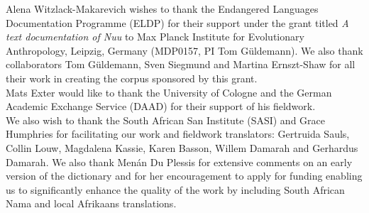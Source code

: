 Alena Witzlack-Makarevich wishes to thank the Endangered Languages
Documentation Programme (ELDP) for their support under the grant
titled \emph{A text documentation of N\textipa{\textvertline}uu} to Max
Planck Institute for Evolutionary \mbox{Anthropology}, Leipzig, Germany
(MDP0157, PI Tom G\"{u}ldemann). We also thank collaborators Tom
G\"{u}ldemann, Sven Siegmund and Martina Ernszt-Shaw for all their
work in creating the corpus sponsored by this grant.\\

Mats Exter would like to thank the University of Cologne and the
German Academic Exchange Service (DAAD) for their support of his
fieldwork.\\

We also wish to thank the South African San Institute (SASI) and Grace
Humphries for facilitating our work and fieldwork translators:
Gertruida Sauls, Collin Louw, Magdalena Kassie, Karen Basson, Willem
Damarah and Gerhardus Damarah. We also thank Men\'{a}n Du Plessis for
extensive comments on an early version of the dictionary and for her
encouragement to apply for funding enabling us to significantly
enhance the quality of the work by including South African Nama and
local Afrikaans translations.\\

